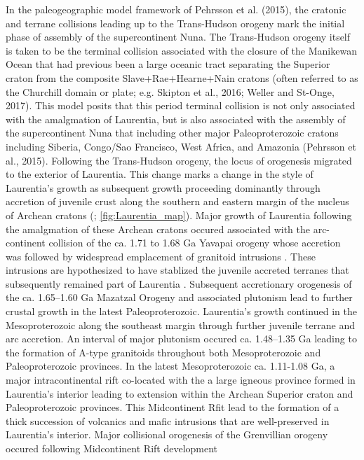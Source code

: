 \documentclass[11pt,letterpaper]{article}
\begin{document}
In the paleogeographic model framework of Pehrsson et al. (2015), the cratonic and terrane collisions leading up to the Trans-Hudson orogeny mark the initial phase of assembly of the supercontinent Nuna. The Trans-Hudson orogeny itself is taken to be the terminal collision associated with the closure of the Manikewan Ocean that had previous been a large oceanic tract separating the Superior craton from the composite Slave+Rae+Hearne+Nain cratons (often referred to as the Churchill domain or plate; e.g. Skipton et al., 2016; Weller and St-Onge, 2017). This model posits that this period terminal collision is not only associated with the amalgmation of Laurentia, but is also associated with the assembly of the supercontinent Nuna that including other major Paleoproterozoic cratons including Siberia, Congo/Sao Francisco, West Africa, and Amazonia (Pehrsson et al., 2015). Following the Trans-Hudson orogeny, the locus of orogenesis migrated to the exterior of Laurentia. This change marks a change in the style of Laurentia's growth as subsequent growth proceeding dominantly through accretion of juvenile crust along the southern and eastern margin of the nucleus of Archean cratons (\citealp{Whitmeyer2007a}; \ref{fig:Laurentia_map}). Major growth of Laurentia following the amalgmation of these Archean cratons occured associated with the arc-continent collision of the ca. 1.71 to 1.68 Ga Yavapai orogeny whose accretion was followed by widespread emplacement of granitoid intrusions \citep{Whitmeyer2007a}. These intrusions are hypothesized to have stablized the juvenile accreted terranes that subsequently remained part of Laurentia \citep{Whitmeyer2007a}. Subsequent accretionary orogenesis of the ca. 1.65–1.60 Ga Mazatzal Orogeny and associated plutonism lead to further crustal growth in the latest Paleoproterozoic. Laurentia's growth continued in the Mesoproterozoic along the southeast margin through further juvenile terrane and arc accretion. An interval of major plutonism occured ca. 1.48–1.35 Ga leading to the formation of A-type granitoids throughout both Mesoproterozoic and Paleoproterozoic provinces. In the latest Mesoproterozoic ca. 1.11-1.08 Ga, a major intracontinental rift co-located with the a large igneous province formed in Laurentia's interior leading to extension within the Archean Superior craton and Paleoproterozoic provinces. This Midcontinent Rfit lead to the formation of a thick succession of volcanics and mafic intrusions that are well-preserved in Laurentia's interior. Major collisional orogenesis of the Grenvillian orogeny occured following Midcontinent Rift development 
\end{document}
